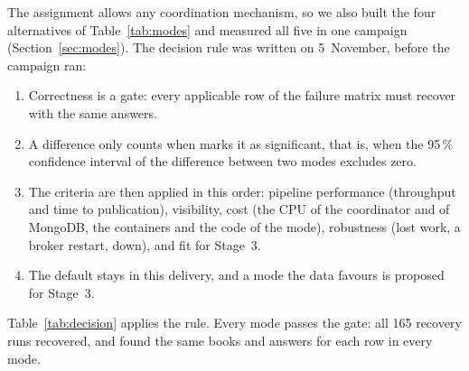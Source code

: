 The assignment allows any coordination mechanism, so we also built the four alternatives of Table~\ref{tab:modes} and
measured all five in one campaign (Section~\ref{sec:modes}). The decision rule was written on 5~November, before the
campaign ran:
\begin{enumerate}
\item Correctness is a gate: every applicable row of the failure matrix must recover with the same answers.
\item A difference only counts when  marks it as significant, that is, when the 95\,\% confidence
  interval of the difference between two modes excludes zero.
\item The criteria are then applied in this order: pipeline performance (throughput and time to publication),
  visibility, cost (the CPU of the coordinator and of MongoDB, the containers and the code of the mode), robustness
  (lost work, a broker restart,  down), and fit for Stage~3.
\item The default stays  in this delivery, and a mode the data favours is proposed for Stage~3.
\end{enumerate}

Table~\ref{tab:decision} applies the rule. Every mode passes the gate: all 165 recovery runs recovered, and
 found the same books and answers for each row in every mode.

